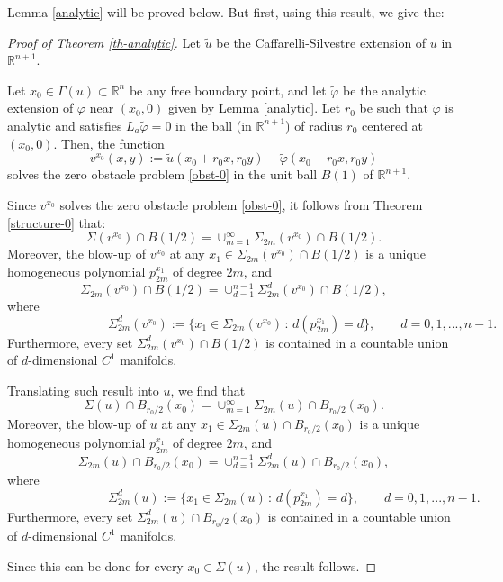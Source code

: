 \documentclass[11pt]{amsart}
\theoremstyle{plain}
\numberwithin{equation}{section}
\begin{document}
Lemma \ref{analytic} will be proved below.
But first, using this result, we give the:

\begin{proof}[Proof of Theorem \ref{th-analytic}]
Let $\tilde u$ be the Caffarelli-Silvestre extension of $u$ in ${\mathbb R}^{n+1}$.

Let $x_0\in \Gamma(u)\subset {\mathbb R}^n$ be any free boundary point, and let $\tilde \varphi$ be the analytic extension of $\varphi$ near $(x_0,0)$ given by Lemma \ref{analytic}.
Let $r_0$ be such that $\tilde \varphi$ is analytic and satisfies $L_a\tilde\varphi=0$ in the ball (in ${\mathbb R}^{n+1}$) of radius $r_0$ centered at $(x_0,0)$.
Then, the function
\begin{equation}\label{v-analytic}
v^{x_0}(x,y):=\tilde{u}(x_0+r_0x,r_0y)-\tilde\varphi(x_0+r_0x,r_0y)
\end{equation}
solves the zero obstacle problem \eqref{obst-0} in the unit ball $B(1)$ of ${\mathbb R}^{n+1}$.

Since $v^{x_0}$ solves the zero obstacle problem \eqref{obst-0}, it follows from Theorem \ref{structure-0} that:
\[\Sigma(v^{x_0})\cap B(1/2)=\cup_{m=1}^\infty \Sigma_{2m}(v^{x_0})\cap B(1/2).\]
Moreover, the blow-up of $v^{x_0}$ at any $x_1\in \Sigma_{2m}(v^{x_0})\cap B(1/2)$ is a {unique} homogeneous polynomial $p_{2m}^{x_1}$ of degree $2m$, and
\[\Sigma_{2m}(v^{x_0})\cap B(1/2)=\cup_{d=1}^{n-1}\Sigma_{2m}^d(v^{x_0})\cap B(1/2),\]
where
\[\qquad\qquad\qquad\qquad\Sigma_{2m}^d(v^{x_0}):=\bigl\{x_1\in \Sigma_{2m}(v^{x_0})\,:\, d(p_{2m}^{x_1})=d\bigr\},\qquad d=0,1,...,n-1.\]
Furthermore, every set $\Sigma_{2m}^d(v^{x_0})\cap B(1/2)$ is contained in a countable union of $d$-dimensional $C^1$ manifolds.

Translating such result into $u$, we find that
\[\Sigma(u)\cap B_{r_0/2}(x_0)=\cup_{m=1}^\infty \Sigma_{2m}(u)\cap B_{r_0/2}(x_0).\]
Moreover, the blow-up of $u$ at any $x_1\in \Sigma_{2m}(u)\cap B_{r_0/2}(x_0)$ is a {unique} homogeneous polynomial $p_{2m}^{x_1}$ of degree $2m$, and
\[\Sigma_{2m}(u)\cap B_{r_0/2}(x_0)=\cup_{d=1}^{n-1}\Sigma_{2m}^d(u)\cap B_{r_0/2}(x_0),\]
where
\[\qquad\qquad\qquad\qquad\Sigma_{2m}^d(u):=\bigl\{x_1\in \Sigma_{2m}(u)\,:\, d(p_{2m}^{x_1})=d\bigr\},\qquad d=0,1,...,n-1.\]
Furthermore, every set $\Sigma_{2m}^d(u)\cap B_{r_0/2}(x_0)$ is contained in a countable union of $d$-dimensional $C^1$ manifolds.

Since this can be done for every $x_0\in \Sigma(u)$, the result follows.
\end{proof}
\end{document}
